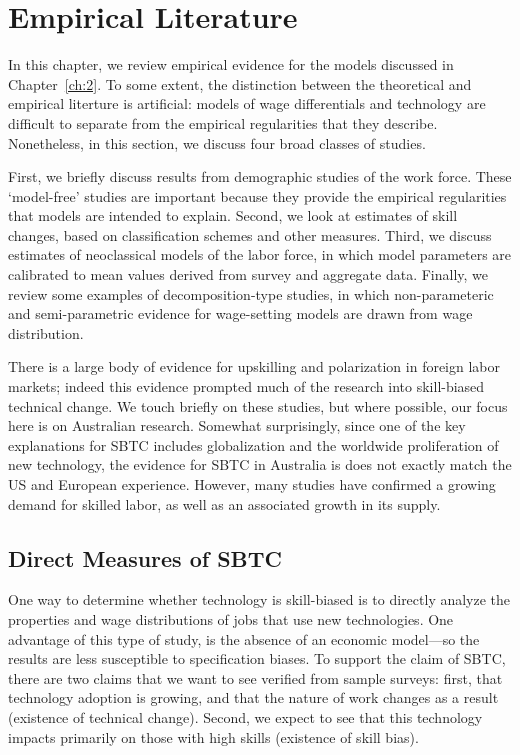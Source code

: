 \chapter{Empirical Literature}\label{ch:3}

In this chapter, we review empirical evidence for the models discussed in Chapter~\ref{ch:2}. To some extent, the distinction between the theoretical and empirical literture is artificial: models of wage differentials and technology are difficult to separate from the empirical regularities that they describe. Nonetheless, in this section, we discuss four broad classes of studies.

First, we briefly discuss results from demographic studies of the work force. These `model-free' studies are important because they provide the empirical regularities that models are intended to explain. Second, we look at estimates of skill changes, based on classification schemes and other measures. Third, we discuss estimates of neoclassical models of the labor force, in which model parameters are calibrated to mean values derived from survey and aggregate data. Finally, we review some examples of decomposition-type studies, in which non-parameteric and semi-parametric evidence for wage-setting models are drawn from wage distribution.

There is a large body of evidence for upskilling and polarization in foreign labor markets; indeed this evidence prompted much of the research into skill-biased technical change. We touch briefly on these studies, but where possible, our focus here is on Australian research. Somewhat surprisingly, since one of the key explanations for SBTC includes globalization and the worldwide proliferation of new technology, the evidence for SBTC in Australia is does not exactly match the US and European experience. However, many studies have confirmed a growing demand for skilled labor, as well as an associated growth in its supply.

\section{Direct Measures of SBTC}\label{sec:direct}

One way to determine whether technology is skill-biased is to directly analyze the properties and wage distributions of jobs that use new technologies. One advantage of this type of study, is the absence of an economic model---so the results are less susceptible to specification biases. To support the claim of SBTC, there are two claims that we want to see verified from sample surveys: first, that technology adoption is growing, and that the nature of work changes as a result (existence of technical change). Second, we expect to see that this technology impacts primarily on those with high skills (existence of skill bias).

